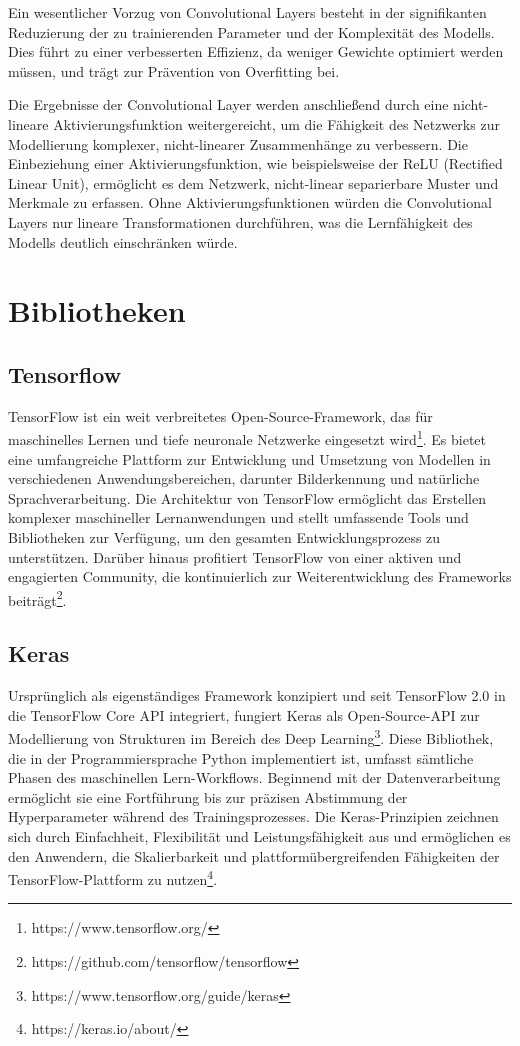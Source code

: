 Ein wesentlicher Vorzug von Convolutional Layers besteht in der signifikanten Reduzierung der zu trainierenden Parameter und der Komplexität des Modells. Dies führt zu einer verbesserten Effizienz, da weniger Gewichte optimiert werden müssen, und trägt zur Prävention von Overfitting bei\cite{Yamashita.2018,OShea.2015}.

Die Ergebnisse der Convolutional Layer werden anschließend durch eine nicht-lineare Aktivierungsfunktion weitergereicht, um die Fähigkeit des Netzwerks zur Modellierung komplexer, nicht-linearer Zusammenhänge zu verbessern. Die Einbeziehung einer Aktivierungsfunktion, wie beispielsweise der ReLU (Rectified Linear Unit), ermöglicht es dem Netzwerk, nicht-linear separierbare Muster und Merkmale zu erfassen. Ohne Aktivierungsfunktionen würden die Convolutional Layers nur lineare Transformationen durchführen, was die Lernfähigkeit des Modells deutlich einschränken würde\cite{Sharma.2017}.

\section{Bibliotheken}
\subsection{Tensorflow}
TensorFlow ist ein weit verbreitetes Open-Source-Framework, das für maschinelles Lernen und tiefe neuronale Netzwerke eingesetzt wird\footnote{https://www.tensorflow.org/}. Es bietet eine umfangreiche Plattform zur Entwicklung und Umsetzung von Modellen in verschiedenen Anwendungsbereichen, darunter Bilderkennung und natürliche Sprachverarbeitung. Die Architektur von TensorFlow ermöglicht das Erstellen komplexer maschineller Lernanwendungen und stellt umfassende Tools und Bibliotheken zur Verfügung, um den gesamten Entwicklungsprozess zu unterstützen. Darüber hinaus profitiert TensorFlow von einer aktiven und engagierten Community, die kontinuierlich zur Weiterentwicklung des Frameworks beiträgt\footnote{https://github.com/tensorflow/tensorflow}.

\subsection{Keras}
Ursprünglich als eigenständiges Framework konzipiert und seit TensorFlow 2.0 in die TensorFlow Core API integriert, fungiert Keras als Open-Source-API zur Modellierung von Strukturen im Bereich des Deep Learning\footnote{https://www.tensorflow.org/guide/keras}. Diese Bibliothek, die in der Programmiersprache Python implementiert ist, umfasst sämtliche Phasen des maschinellen Lern-Workflows. Beginnend mit der Datenverarbeitung ermöglicht sie eine Fortführung bis zur präzisen Abstimmung der Hyperparameter während des Trainingsprozesses. Die Keras-Prinzipien zeichnen sich durch Einfachheit, Flexibilität und Leistungsfähigkeit aus und ermöglichen es den Anwendern, die Skalierbarkeit und plattformübergreifenden Fähigkeiten der TensorFlow-Plattform zu nutzen\footnote{https://keras.io/about/}.

